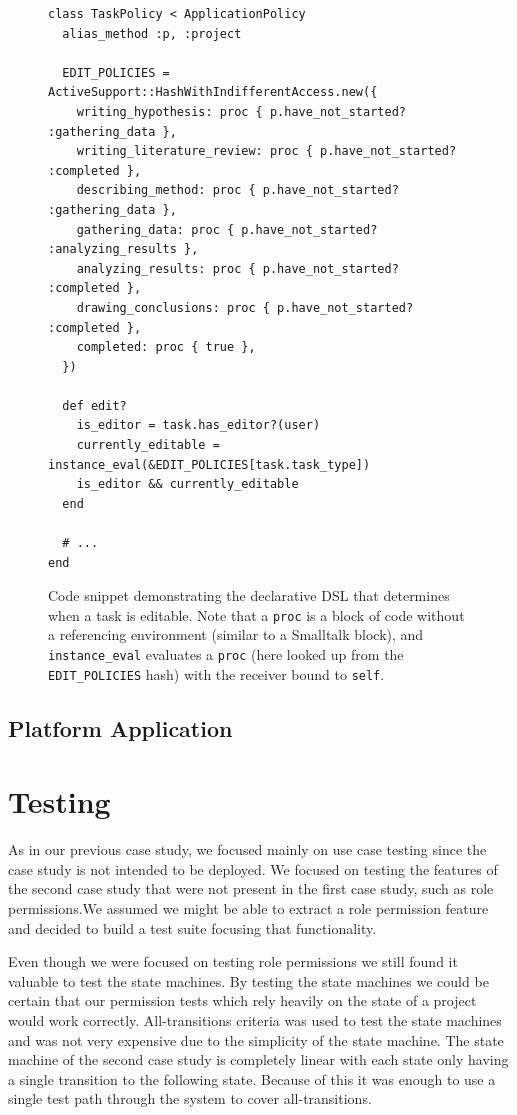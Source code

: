 \documentclass[document.tex]{subfiles}
\begin{document}
\begin{figure}[!ht]
  \begin{lstlisting}
class TaskPolicy < ApplicationPolicy
  alias_method :p, :project

  EDIT_POLICIES = ActiveSupport::HashWithIndifferentAccess.new({
    writing_hypothesis: proc { p.have_not_started? :gathering_data },
    writing_literature_review: proc { p.have_not_started? :completed },
    describing_method: proc { p.have_not_started? :gathering_data },
    gathering_data: proc { p.have_not_started? :analyzing_results },
    analyzing_results: proc { p.have_not_started? :completed },
    drawing_conclusions: proc { p.have_not_started? :completed },
    completed: proc { true },
  })

  def edit?
    is_editor = task.has_editor?(user)
    currently_editable = instance_eval(&EDIT_POLICIES[task.task_type])
    is_editor && currently_editable
  end

  # ...
end
  \end{lstlisting}
  \cprotect\caption{Code snippet demonstrating the declarative DSL that determines when a task is editable. Note that a \verb!proc! is a block of code without a referencing environment (similar to a Smalltalk block), and \verb!instance_eval! evaluates a \verb!proc! (here looked up from the \verb!EDIT_POLICIES! hash) with the receiver bound to \verb!self!.}
  \label{fig:case-research-state-based-policy}
\end{figure}

\FloatBarrier


\subsection {Platform Application}



\section {Testing}

As in our previous case study, we focused mainly on use case testing since the case study is not intended to be deployed. We focused on testing the features of the second case study that were not present in the first case study, such as role permissions.We assumed we might be able to extract a role permission feature and decided to build a test suite focusing that functionality.

Even though we were focused on testing role permissions we still found it valuable to test the state machines. By testing the state machines we could be certain that our permission tests which rely heavily on the state of a project would work correctly. All-transitions criteria was used to test the state machines and was not very expensive due to the simplicity of the state machine. The state machine of the second case study is completely linear with each state only having a single transition to the following state. Because of this it was enough to use a single test path through the system to cover all-transitions.
\end{document}
